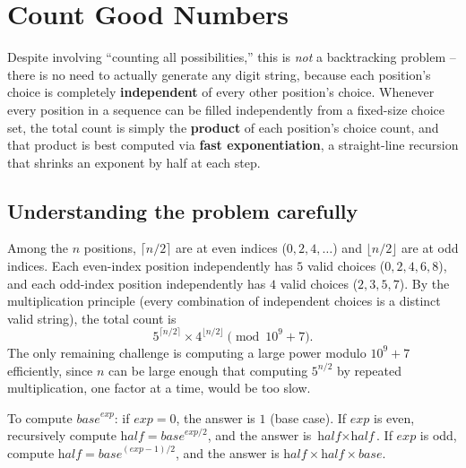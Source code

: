 \section{Count Good Numbers}
\label{sec:rec-good-numbers}


\begin{patternbox}
Despite involving ``counting all possibilities,'' this is \emph{not} a
backtracking problem -- there is no need to actually generate any digit
string, because each position's choice is completely \textbf{independent}
of every other position's choice. Whenever every position in a sequence
can be filled independently from a fixed-size choice set, the total count
is simply the \textbf{product} of each position's choice count, and that
product is best computed via \textbf{fast exponentiation}, a
straight-line recursion that shrinks an exponent by half at each step.
\end{patternbox}

\subsection*{Understanding the problem carefully}

Among the $n$ positions, $\lceil n/2 \rceil$ are at even indices ($0, 2,
4, \dots$) and $\lfloor n/2 \rfloor$ are at odd indices. Each even-index
position independently has $5$ valid choices ($0,2,4,6,8$), and each
odd-index position independently has $4$ valid choices ($2,3,5,7$). By
the multiplication principle (every combination of independent choices
is a distinct valid string), the total count is
\[
  5^{\lceil n/2 \rceil} \times 4^{\lfloor n/2 \rfloor} \pmod{10^9+7}.
\]
The only remaining challenge is computing a large power modulo $10^9+7$
efficiently, since $n$ can be large enough that computing $5^{n/2}$ by
repeated multiplication, one factor at a time, would be too slow.

\begin{ideabox}
To compute $\textit{base}^{\textit{exp}}$: if $\textit{exp}=0$, the
answer is $1$ (base case). If $\textit{exp}$ is even, recursively compute
$\textit{half} = \textit{base}^{\textit{exp}/2}$, and the answer is
$\textit{half} \times \textit{half}$. If $\textit{exp}$ is odd, compute
$\textit{half} = \textit{base}^{(\textit{exp}-1)/2}$, and the answer is
$\textit{half} \times \textit{half} \times \textit{base}$.
\end{ideabox}

